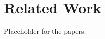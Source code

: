 \section{Related Work}
\label{sec:related}

Placeholder for the papers.
\cite{thiagarajan:mobbat}

\cite{balasubramanian:encon}

\cite{vallina-rod:ads}

